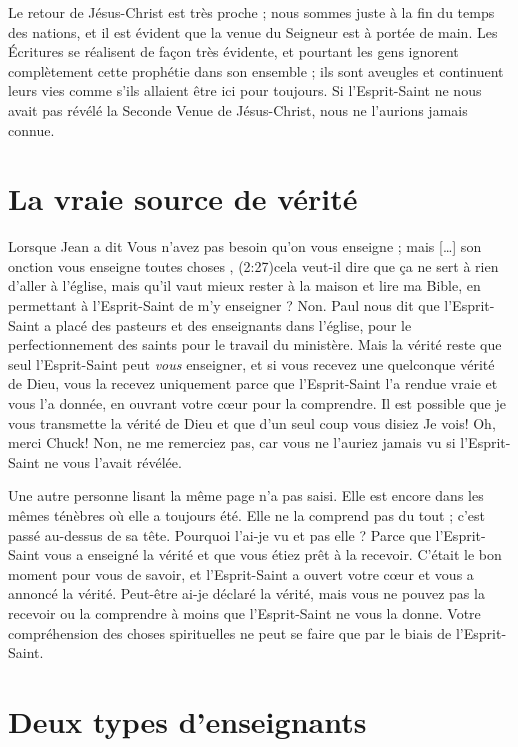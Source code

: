 Le retour de Jésus-Christ est très proche ; nous sommes juste à la fin
 du temps des nations, et il est évident que la venue du Seigneur
 est à portée de main. Les Écritures se réalisent de façon très évidente,
 et pourtant les gens ignorent complètement cette prophétie
 dans son ensemble ; ils sont aveugles et continuent leurs vies
 comme s'ils allaient être ici pour toujours.
 Si l'Esprit-Saint ne nous avait pas révélé la Seconde Venue de Jésus-Christ,
 nous ne l'aurions jamais connue.


\section{La vraie source de v\'erit\'e}

Lorsque Jean a dit\frcolon{}
 \Og Vous n'avez pas besoin qu'on vous enseigne ;
 mais [\dots{}] son onction vous enseigne toutes choses \Fg{},
 (2:27)cela veut-il dire que ça ne sert à rien
 d'aller à l'église,
 mais qu'il vaut mieux rester à la maison et lire ma Bible,
 en permettant à l'Esprit-Saint de m'y enseigner ? Non.
 Paul nous dit que l'Esprit-Saint a placé des pasteurs
 et des enseignants dans l'église, pour le perfectionnement des saints
 pour le travail du ministère.
 Mais la vérité reste que seul l'Esprit-Saint peut \emph{vous} enseigner,
 et si vous recevez une quelconque vérité de Dieu,
 vous la recevez uniquement parce que l'Esprit-Saint
 l'a rendue vraie et vous l'a donnée, en ouvrant votre cœur
 pour la comprendre.
 Il est possible que je vous transmette la vérité de Dieu
 et que d'un seul coup vous disiez\frcolon{} \Og Je vois!
 Oh, merci Chuck! \Fg{} Non, ne me remerciez pas,
 car vous ne l'auriez jamais vu si l'Esprit-Saint
 ne vous l'avait révélée.
 \nowidow[4]


Une autre personne lisant la même page n'a pas saisi.
 Elle est encore dans les mêmes ténèbres où elle a toujours été.
 Elle ne la comprend pas du tout ; c'est passé au-dessus de sa tête.
 \Og Pourquoi l'ai-je vu et pas elle ? \Fg{}
 Parce que l'Esprit-Saint vous a enseigné la vérité et que
 vous étiez prêt à la recevoir.
 C'était le bon moment pour vous de savoir, et l'Esprit-Saint
 a ouvert votre cœur et vous a annoncé la vérité.
 Peut-être ai-je déclaré la vérité, mais vous ne pouvez pas la recevoir
 ou la comprendre à moins que l'Esprit-Saint ne vous la donne.
 Votre compréhension des choses spirituelles ne peut se faire
 que par le biais de l'Esprit-Saint.


\section{Deux types d'enseignants}

